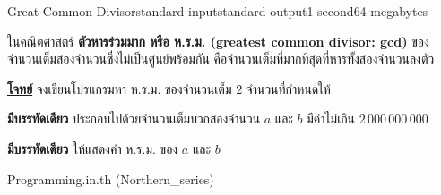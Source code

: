 \documentclass[11pt,a4paper]{article}
\begin{document}
\begin{problem}{Great Common Divisor}{standard input}{standard output}{1 second}{64 megabytes}

ในคณิตศาสตร์ \textbf{ตัวหารร่วมมาก หรือ ห.ร.ม. (greatest common divisor: gcd)} ของจำนวนเต็มสองจำนวนซึ่งไม่เป็นศูนย์พร้อมกัน คือจำนวนเต็มที่มากที่สุดที่หารทั้งสองจำนวนลงตัว


\underline{\textbf{โจทย์}} จงเขียนโปรแกรมหา ห.ร.ม. ของจำนวนเต็ม $2$ จำนวนที่กำหนดให้

\InputFile

\textbf{มีบรรทัดเดียว} ประกอบไปด้วยจำนวนเต็มบวกสองจำนวน $a$ และ $b$ มีค่าไม่เกิน $2\,000\,000\,000$

\OutputFile

\textbf{มีบรรทัดเดียว} ให้แสดงค่า ห.ร.ม. ของ $a$ และ $b$

\Examples

\begin{example}
%
%
\end{example}

\Source

Programming.in.th (Northern\_series)

\end{problem}
\end{document}
